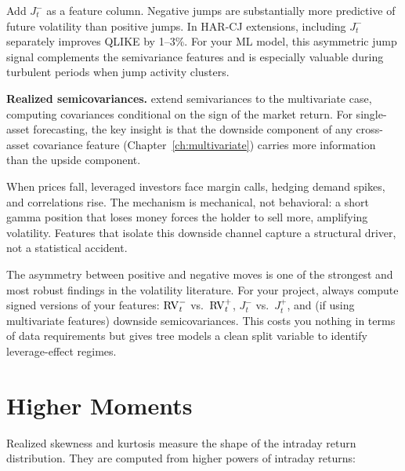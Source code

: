 \begin{projectconnection}
Add $J_t^-$ as a feature column. Negative jumps are substantially more predictive of future volatility than positive jumps. In HAR-CJ extensions, including $J_t^-$ separately improves QLIKE by 1--3\%. For your ML model, this asymmetric jump signal complements the semivariance features and is especially valuable during turbulent periods when jump activity clusters.
\end{projectconnection}

\textbf{Realized semicovariances.}
\citet{BollerslevLiPattonQuaedvlieg2020} extend semivariances to the multivariate case, computing covariances conditional on the sign of the market return.
For single-asset forecasting, the key insight is that the downside component of any cross-asset covariance feature (Chapter~\ref{ch:multivariate}) carries more information than the upside component.

\begin{intuition}
When prices fall, leveraged investors face margin calls, hedging demand spikes, and correlations rise.
The mechanism is mechanical, not behavioral: a short gamma position that loses money forces the holder to sell more, amplifying volatility.
Features that isolate this downside channel capture a structural driver, not a statistical accident.
\end{intuition}

\begin{projectconnection}
The asymmetry between positive and negative moves is one of the strongest and most robust findings in the volatility literature. For your project, always compute signed versions of your features: $\operatorname{RV}_t^-$ vs.\ $\operatorname{RV}_t^+$, $J_t^-$ vs.\ $J_t^+$, and (if using multivariate features) downside semicovariances. This costs you nothing in terms of data requirements but gives tree models a clean split variable to identify leverage-effect regimes.
\end{projectconnection}

\section{Higher Moments}\label{sec:feat-moments}

Realized skewness and kurtosis measure the shape of the intraday return distribution. They are computed from higher powers of intraday returns:

